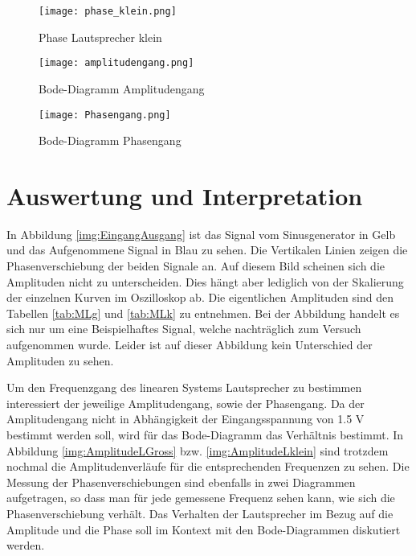 \begin{figure}[H]
\centering
\texttt{[image: phase\_klein.png]}
\caption{Phase Lautsprecher klein}
\label{img:PhaseKlein}
\end{figure}

\begin{figure}[H]
\centering
\texttt{[image: amplitudengang.png]}
\caption{Bode-Diagramm Amplitudengang}
\label{img:BodeAmplitude}
\end{figure}

\begin{figure}[H]
\centering
\texttt{[image: Phasengang.png]}
\caption{Bode-Diagramm Phasengang}
\label{img:PhasenGang Bode-Diagramm}
\end{figure}


\section{Auswertung und Interpretation}
\label{chap:AUSWERTUNGUNDINTERPRETATION}
In Abbildung \ref{img:EingangAusgang} ist das Signal vom Sinusgenerator in Gelb und das Aufgenommene Signal in Blau zu sehen. Die Vertikalen Linien zeigen die Phasenverschiebung der beiden Signale an. Auf diesem Bild scheinen sich die Amplituden nicht zu unterscheiden. Dies hängt aber lediglich von der Skalierung der einzelnen Kurven im Oszilloskop ab. Die eigentlichen Amplituden sind den Tabellen \ref{tab:MLg} und \ref{tab:MLk} zu entnehmen. Bei der Abbildung handelt es sich nur um eine Beispielhaftes Signal, welche nachträglich zum Versuch aufgenommen wurde. Leider ist auf dieser Abbildung kein Unterschied der Amplituden zu sehen.

Um den Frequenzgang des linearen Systems Lautsprecher zu bestimmen interessiert der jeweilige Amplitudengang, sowie der Phasengang. Da der Amplitudengang nicht in Abhängigkeit der Eingangsspannung von 1.5 V bestimmt werden soll, wird für das Bode-Diagramm das Verhältnis bestimmt. In Abbildung \ref{img:AmplitudeLGross} bzw. \ref{img:AmplitudeLklein} sind trotzdem nochmal die Amplitudenverläufe für die entsprechenden Frequenzen zu sehen. Die Messung der Phasenverschiebungen sind ebenfalls in zwei Diagrammen aufgetragen, so dass man für jede gemessene Frequenz sehen kann, wie sich die Phasenverschiebung verhält. Das Verhalten der Lautsprecher im Bezug auf die Amplitude und die Phase soll im Kontext mit den Bode-Diagrammen diskutiert werden.

